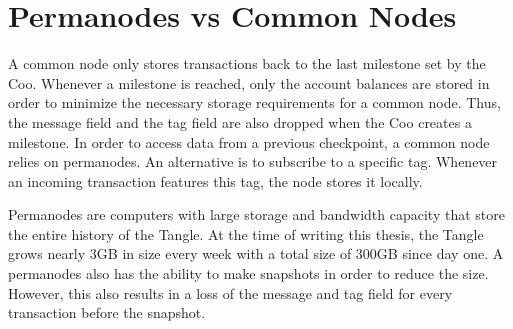 \section{Permanodes vs Common Nodes}

A common node only stores transactions back to the last milestone set by the Coo. Whenever a milestone is reached, only the account balances are stored in order to minimize the necessary storage requirements for a common node. Thus, the message field and the tag field are also dropped when the Coo creates a milestone. In order to access data from a previous checkpoint, a common node relies on permanodes. An alternative is to subscribe to a specific tag. Whenever an incoming transaction features this tag, the node stores it locally. 

Permanodes are computers with large storage and bandwidth capacity that store the entire history of the Tangle. At the time of writing this thesis, the Tangle grows nearly 3GB in size every week with a total size of 300GB since day one. A permanodes also has the ability to make snapshots in order to reduce the size. However, this also results in a loss of the message and tag field for every transaction before the snapshot.
